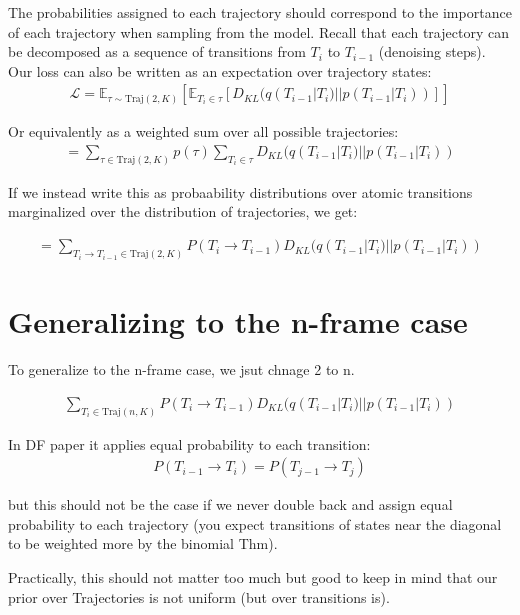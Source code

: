 \documentclass[11pt]{article}
\begin{document}
The probabilities assigned to each trajectory should correspond to the importance of each trajectory when sampling from the model. Recall that each trajectory can be decomposed as a sequence of transitions from $T_i$ to $T_{i-1}$ (denoising steps). Our loss can also be written as an expectation over trajectory states:
\begin{align}
\mathcal{L} = \mathbb{E}_{\tau \sim \text{Traj}(2,K)} \left[ \mathbb{E}_{T_i \in \tau} \left[ D_{KL}(q(T_{i-1} | T_i) || p(T_{i-1} | T_i)) \right] \right]
\end{align}

Or equivalently as a weighted sum over all possible trajectories:
\begin{align}
= \sum_{\tau \in \text{Traj}(2,K)} p(\tau) \sum_{T_i \in \tau} D_{KL}(q(T_{i-1} | T_i) || p(T_{i-1} | T_i))
\end{align}

If we instead write this as probaability distributions over atomic transitions marginalized over the distribution of trajectories, we get:

\begin{align}
= \sum_{T_i \rightarrow T_{i-1} \in \text{Traj}(2,K)} P(T_i \rightarrow T_{i-1}) D_{KL}(q(T_{i-1} | T_i) || p(T_{i-1} | T_i))
\end{align}

\section{Generalizing to the n-frame case}

To generalize to the n-frame case, we jsut chnage 2 to n.

\begin{align}
\sum_{T_i \in \text{Traj}(n,K)} P(T_i \rightarrow T_{i-1}) D_{KL}(q(T_{i-1} | T_i) || p(T_{i-1} | T_i))
\end{align}

In DF paper it applies equal probability to each transition:
\begin{align}
P(T_{i-1} \rightarrow T_i) = P(T_{j-1} \rightarrow T_j) 
\end{align}

but this should not be the case if we never double back and assign equal probability to each trajectory (you expect transitions of states near the diagonal to be weighted more by the binomial Thm).

Practically, this should not matter too much but good to keep in mind that our prior over Trajectories is not uniform (but over transitions is).
\end{document}
